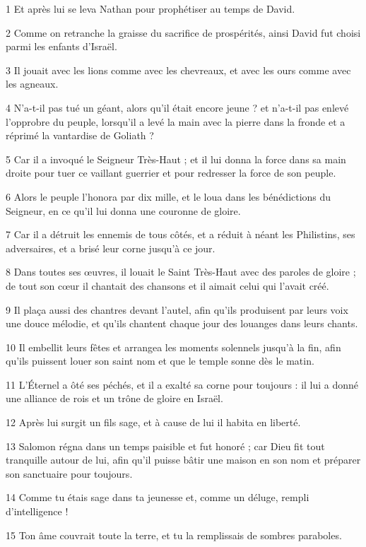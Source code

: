\par 1 Et après lui se leva Nathan pour prophétiser au temps de David.
\par 2 Comme on retranche la graisse du sacrifice de prospérités, ainsi David fut choisi parmi les enfants d'Israël.
\par 3 Il jouait avec les lions comme avec les chevreaux, et avec les ours comme avec les agneaux.
\par 4 N'a-t-il pas tué un géant, alors qu'il était encore jeune ? et n'a-t-il pas enlevé l'opprobre du peuple, lorsqu'il a levé la main avec la pierre dans la fronde et a réprimé la vantardise de Goliath ?
\par 5 Car il a invoqué le Seigneur Très-Haut ; et il lui donna la force dans sa main droite pour tuer ce vaillant guerrier et pour redresser la force de son peuple.
\par 6 Alors le peuple l'honora par dix mille, et le loua dans les bénédictions du Seigneur, en ce qu'il lui donna une couronne de gloire.
\par 7 Car il a détruit les ennemis de tous côtés, et a réduit à néant les Philistins, ses adversaires, et a brisé leur corne jusqu'à ce jour.
\par 8 Dans toutes ses œuvres, il louait le Saint Très-Haut avec des paroles de gloire ; de tout son cœur il chantait des chansons et il aimait celui qui l'avait créé.
\par 9 Il plaça aussi des chantres devant l'autel, afin qu'ils produisent par leurs voix une douce mélodie, et qu'ils chantent chaque jour des louanges dans leurs chants.
\par 10 Il embellit leurs fêtes et arrangea les moments solennels jusqu'à la fin, afin qu'ils puissent louer son saint nom et que le temple sonne dès le matin.
\par 11 L'Éternel a ôté ses péchés, et il a exalté sa corne pour toujours : il lui a donné une alliance de rois et un trône de gloire en Israël.
\par 12 Après lui surgit un fils sage, et à cause de lui il habita en liberté.
\par 13 Salomon régna dans un temps paisible et fut honoré ; car Dieu fit tout tranquille autour de lui, afin qu'il puisse bâtir une maison en son nom et préparer son sanctuaire pour toujours.
\par 14 Comme tu étais sage dans ta jeunesse et, comme un déluge, rempli d'intelligence !
\par 15 Ton âme couvrait toute la terre, et tu la remplissais de sombres paraboles.
